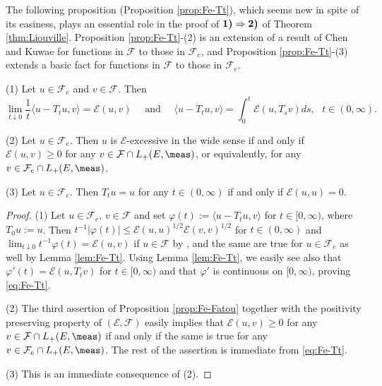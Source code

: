 The following proposition (Proposition \ref{prop:Fe-Tt}), which seems new
in spite of its easiness, plays an essential role in the proof of
$\textrm{\bfseries\upshape 1)}\Rightarrow\textrm{\bfseries\upshape 2)}$
of Theorem \ref{thm:Liouville}. Proposition \ref{prop:Fe-Tt}-(2) is an extension
of a result of Chen and Kuwae \cite[Lemma 3.1]{CK:subh} for functions in $\mathcal{F}$
to those in $\mathcal{F}_{e}$, and Proposition \ref{prop:Fe-Tt}-(3) extends
a basic fact for functions in $\mathcal{F}$ to those in $\mathcal{F}_{e}$.
%
\begin{prop}\label{prop:Fe-Tt}
\textup{(1)} Let $u\in\mathcal{F}_{e}$ and $v\in\mathcal{F}$. Then
\begin{equation}\label{eq:Fe-Tt}
\lim_{t\downarrow 0}\frac{1}{t}\langle u-T_{t}u,v\rangle
    =\mathcal{E}(u,v)
    \mspace{24mu}\textrm{and}\mspace{24mu}
    \langle u-T_{t}u,v\rangle=\int_{0}^{t}\mathcal{E}(u,T_{s}v)ds,
    \mspace{12mu}t\in(0,\infty).
\end{equation}

\noindent
\textup{(2)} Let $u\in\mathcal{F}_{e}$. Then $u$ is $\mathcal{E}$-excessive in the wide sense
if and only if $\mathcal{E}(u,v)\geq 0$ for any $v\in\mathcal{F}\cap L_{+}(E,\meas)$,
or equivalently, for any $v\in\mathcal{F}_{e}\cap L_{+}(E,\meas)$.

\noindent
\textup{(3)} Let $u\in\mathcal{F}_{e}$. Then $T_{t}u=u$ for any $t\in(0,\infty)$
if and only if $\mathcal{E}(u,u)=0$.
\end{prop}
%
\begin{proof}
(1) Let $u\in\mathcal{F}_{e}$, $v\in\mathcal{F}$ and
set $\varphi(t):=\langle u-T_{t}u,v\rangle$ for $t\in[0,\infty)$, where $T_{0}u:=u$.
Then $t^{-1}|\varphi(t)|\leq\mathcal{E}(u,u)^{1/2}\mathcal{E}(v,v)^{1/2}$ for
$t\in(0,\infty)$ and $\lim_{t\downarrow 0}t^{-1}\varphi(t)=\mathcal{E}(u,v)$
if $u\in\mathcal{F}$ by \cite[Lemma 1.3.4-(i)]{FOT}, and the same are true
for $u\in\mathcal{F}_{e}$ as well by Lemma \ref{lem:Fe-Tt}.
Using Lemma \ref{lem:Fe-Tt}, we easily see also that
$\varphi'(t)=\mathcal{E}(u,T_{t}v)$ for $t\in[0,\infty)$ and that
$\varphi'$ is continuous on $[0,\infty)$, proving \eqref{eq:Fe-Tt}.

\noindent
(2) The third assertion of Proposition \ref{prop:Fe-Fatou} together with the positivity
preserving property of $(\mathcal{E},\mathcal{F})$ easily implies that
$\mathcal{E}(u,v)\geq 0$ for any $v\in\mathcal{F}\cap L_{+}(E,\meas)$ if and only if
the same is true for any $v\in\mathcal{F}_{e}\cap L_{+}(E,\meas)$.
The rest of the assertion is immediate from \eqref{eq:Fe-Tt}.

\noindent
(3) This is an immediate consequence of (2).
\end{proof}
